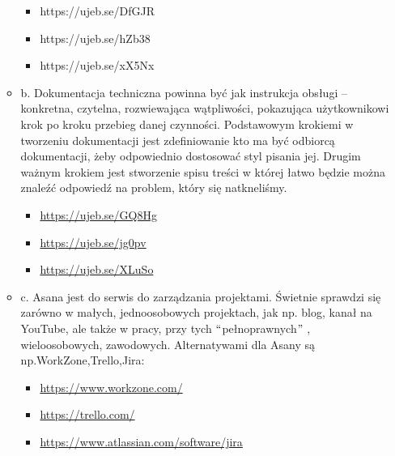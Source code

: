 \documentclass[12pt]{article}
\renewcommand{\_}{\kern-1.5pt\textunderscore\kern-1.5pt}
\begin{document}
\begin{itemize}
\begin{itemize}
\begin{itemize}
	\item https://ujeb.se/DfGJR\par

	\item https://ujeb.se/hZb38\par

	\item https://ujeb.se/xX5Nx\par


\end{itemize}
	\item b. Dokumentacja techniczna powinna być jak instrukcja obsługi – konkretna, czytelna, rozwiewająca wątpliwości, pokazująca użytkownikowi krok po kroku przebieg danej czynności. Podstawowym krokiemi w tworzeniu dokumentacji jest zdefiniowanie kto ma być odbiorcą dokumentacji, żeby odpowiednio dostosować styl pisania jej. Drugim ważnym krokiem jest stworzenie spisu treści w której łatwo będzie można znaleźć odpowiedź na problem, który się natkneliśmy.\par

\begin{itemize}
	\item \href{https://ujeb.se/GQ8Hg}{https://ujeb.se/GQ8Hg} \par

	\item \href{https://ujeb.se/jg0pv}{https://ujeb.se/jg0pv}\par

	\item \href{https://ujeb.se/XLuSo}{https://ujeb.se/XLuSo} \par


\end{itemize}
	\item c. Asana jest do serwis do zarządzania projektami. Świetnie sprawdzi się zarówno w małych, jednoosobowych projektach, jak np. blog, kanał na YouTube, ale także w pracy, przy tych $``$pełnoprawnych$"$ , wieloosobowych, zawodowych. Alternatywami dla Asany są np.WorkZone,Trello,Jira:\par

\begin{itemize}
	\item \href{https://www.workzone.com/%20}{https://www.workzone.com/} \par

	\item \href{https://trello.com/}{https://trello.com/}\par

	\item \href{https://www.atlassian.com/software/jira}{https://www.atlassian.com/software/jira}
\end{itemize}
\end{itemize}
\end{itemize}\par
\end{document}
